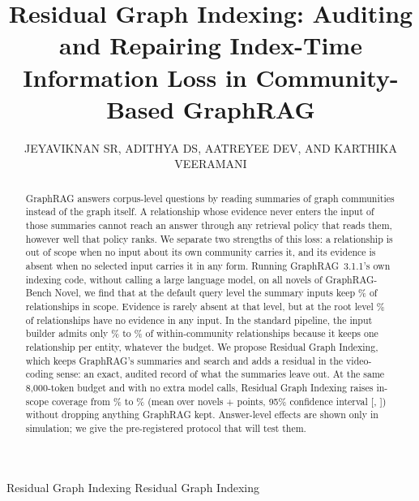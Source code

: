\documentclass{ieeeaccess}
\theoremstyle{remark}
\begin{document}

\title{Residual Graph Indexing: Auditing and Repairing Index-Time Information Loss in Community-Based GraphRAG}

\author{\uppercase{Jeyaviknan SR},
\uppercase{Adithya DS},
\uppercase{Aatreyee Dev}, AND
\uppercase{Karthika Veeramani}}

\address[1]{School of Computer Science and Engineering, Vellore Institute of Technology, Chennai 600127, India (e-mail: jeyaviknan.sr2023@vit.ac.in; adithya.ds2023@vitstudent.ac.in; aatreyee.dev2023@vitstudent.ac.in; karthika.v@vit.ac.in)}

\markboth
{Residual Graph Indexing}
{Residual Graph Indexing}


\begin{abstract}
GraphRAG answers corpus-level questions by reading summaries of graph communities instead of the graph itself. A relationship whose evidence never enters the input of those summaries cannot reach an answer through any retrieval policy that reads them, however well that policy ranks. We separate two strengths of this loss: a relationship is out of scope when no input about its own community carries it, and its evidence is absent when no selected input carries it in any form. Running GraphRAG~3.1.1's own indexing code, without calling a large language model, on all \NNovels{} novels of GraphRAG-Bench Novel, we find that at the default query level the summary inputs keep \CovCG\% of \NRels{} relationships in scope. Evidence is rarely absent at that level, but at the root level \AbsAG\% of relationships have no evidence in any input. In the standard pipeline, the input builder admits only \SelMin\% to \SelMax\% of within-community relationships because it keeps one relationship per entity, whatever the budget. We propose Residual Graph Indexing, which keeps GraphRAG's summaries and search and adds a residual in the video-coding sense: an exact, audited record of what the summaries leave out. At the same 8,000-token budget and with no extra model calls, Residual Graph Indexing raises in-scope coverage from \CovCG\% to \CovCR\% (mean over novels $+$\MacroDiffC{} points, 95\% confidence interval [\MacroDiffCLo, \MacroDiffCHi]) without dropping anything GraphRAG kept. Answer-level effects are shown only in simulation; we give the pre-registered protocol that will test them.
\end{abstract}
\end{document}
